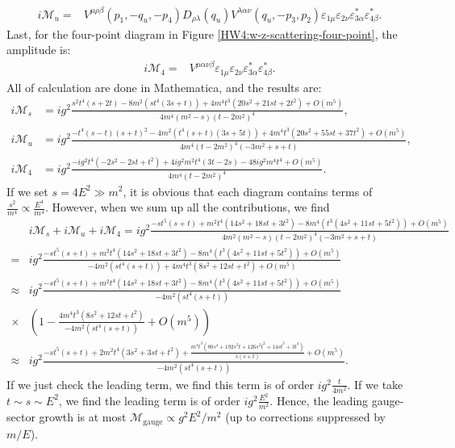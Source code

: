 \begin{align}
    i\mathcal{M}_u =& V^{\mu\rho\beta}(p_1,-q_u,-p_4) D_{\rho\lambda}(q_u) V^{\lambda\alpha\nu}(q_u,-p_3,p_2) \varepsilon_{1\mu} \varepsilon_{2\nu} \varepsilon_{3\alpha}^* \varepsilon_{4\beta}^*.
\end{align}
Last, for the four-point diagram in Figure \ref{HW4:w-z-scattering-four-point}, the amplitude is:
\begin{align}
    i\mathcal{M}_4 =& V^{\mu\alpha\nu\beta} \varepsilon_{1\mu} \varepsilon_{2\nu} \varepsilon_{3\alpha}^* \varepsilon_{4\beta}^*.
\end{align}
All of calculation are done in Mathematica, and the results are:
\begin{align}
    i\mathcal{M}_s&=ig^2\frac{s^2 t^4 (s+2 t)-8 m^2 \left(s t^4 (3 s+t)\right)+4 m^4 t^3 \left(20 s^2+21 s t+2 t^2\right)+O\left(m^5\right)}{4m^4 \left(m^2-s\right) \left( t-2 m^2\right)^4},\\
    i\mathcal{M}_u&=ig^2\frac{-t^4 (s-t) (s+t)^2-4 m^2 \left(t^4 (s+t) (3 s+5 t)\right)+4 m^4 t^3 \left(20 s^2+55 s t+37 t^2\right)+O\left(m^5\right)}{4 m^4\left(t-2 m^2\right)^4 \left(-3 m^2+s+t\right)},\\
    i\mathcal{M}_4&=ig^2\frac{-i g^2 t^4 \left(-2 s^2-2 s t+t^2\right)+4 i g^2 m^2 t^4 (3 t-2 s)-48 i g^2 m^4 t^4+O\left(m^5\right)}{4m^4 ( t-2 m^2)^4}.
\end{align}
If we set $s=4E^2\gg m^2$, it is obvious that each diagram contains terms of $\frac{s^2}{m^4}\propto\frac{E^4}{m^4}$. However, when we sum up all the contributions, we find
\begin{align}
    &i\mathcal{M}_s+i\mathcal{M}_u+i\mathcal{M}_4 = ig^2 \frac{-s t^5 (s+t)+m^2 t^4 \left(14 s^2+18 s t+3 t^2\right)-8 m^4 \left(t^3 \left(4 s^2+11 s t+5 t^2\right)\right)+O\left(m^5\right)}{4 m^2 \left(m^2-s\right) \left(t-2 m^2\right)^4 \left(-3 m^2+s+t\right)}\\
    =&ig^2 \frac{-s t^5 (s+t)+m^2 t^4 \left(14 s^2+18 s t+3 t^2\right)-8 m^4 \left(t^3 \left(4 s^2+11 s t+5 t^2\right)\right)+O\left(m^5\right)}{-4 m^2 \left(s t^4 (s+t)\right)+4 m^4 t^3 \left(8 s^2+12 s t+t^2\right)+O\left(m^5\right)}\\
    \approx& ig^2 \frac{-s t^5 (s+t)+m^2 t^4 \left(14 s^2+18 s t+3 t^2\right)-8 m^4 \left(t^3 \left(4 s^2+11 s t+5 t^2\right)\right)+O\left(m^5\right)}{-4 m^2 \left(s t^4 (s+t)\right)} \\ 
    \times&\left(1 - \frac{4 m^4 t^3 \left(8 s^2+12 s t+t^2\right)}{-4 m^2 \left(s t^4 (s+t)\right)} + O\left(m^5\right) \right)\\
    \approx& ig^2\frac{-s t^5 (s+t)+2 m^2 t^4 \left(3 s^2+3 s t+t^2\right)+\frac{m^4 t^3 \left(80 s^4+192 s^3 t+126 s^2 t^2+14 s t^3+3 t^4\right)}{s (s+t)}+O\left(m^5\right)}{-4 m^2 \left(s t^4 (s+t)\right)}.
\end{align}
If we just check the leading term, we find this term is of order $ig^2\frac{t}{4m^2}$. If we take $t\sim s\sim E^2$, we find the leading term is of order $ig^2\frac{E^2}{m^2}$. Hence, the leading gauge-sector growth is at most $\mathcal{M}_{\text{gauge}}\propto g^2 E^2/m^2$ (up to corrections suppressed by $m/E$). 




